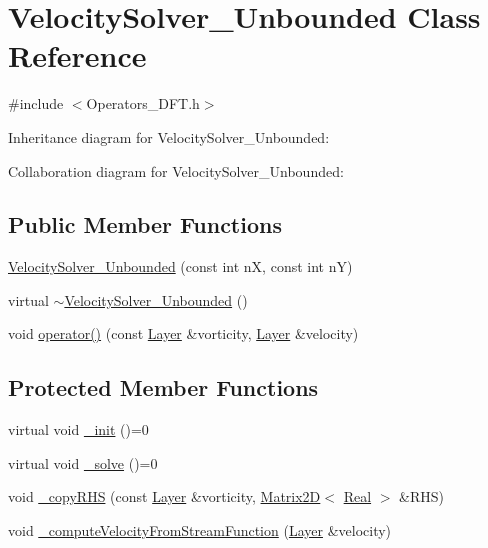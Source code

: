 \hypertarget{class_velocity_solver___unbounded}{}\section{Velocity\+Solver\+\_\+\+Unbounded Class Reference}
\label{class_velocity_solver___unbounded}


{\ttfamily \#include $<$Operators\+\_\+\+D\+F\+T.\+h$>$}



Inheritance diagram for Velocity\+Solver\+\_\+\+Unbounded\+:


Collaboration diagram for Velocity\+Solver\+\_\+\+Unbounded\+:
\subsection*{Public Member Functions}
\begin{DoxyCompactItemize}
\item 
\hyperlink{class_velocity_solver___unbounded_a2a4f55337c05bd3e5a98d732d4524031}{Velocity\+Solver\+\_\+\+Unbounded} (const int n\+X, const int n\+Y)
\item 
virtual \hyperlink{class_velocity_solver___unbounded_ad2dda95d5b3e7cb435fc7223db486f44}{$\sim$\+Velocity\+Solver\+\_\+\+Unbounded} ()
\item 
void \hyperlink{class_velocity_solver___unbounded_a55beef939974ec2b79e869a403245534}{operator()} (const \hyperlink{struct_layer}{Layer} \&vorticity, \hyperlink{struct_layer}{Layer} \&velocity)
\end{DoxyCompactItemize}
\subsection*{Protected Member Functions}
\begin{DoxyCompactItemize}
\item 
virtual void \hyperlink{class_velocity_solver___unbounded_a5e5995e7ef4cb324f6fe4085084b19e6}{\+\_\+init} ()=0
\item 
virtual void \hyperlink{class_velocity_solver___unbounded_ad4a668aa6fcd70274bb71258f2c13b2d}{\+\_\+solve} ()=0
\item 
void \hyperlink{class_velocity_solver___unbounded_a09eef51ffa637ea0ae168a72b4ed13f2}{\+\_\+copy\+R\+H\+S} (const \hyperlink{struct_layer}{Layer} \&vorticity, \hyperlink{class_matrix2_d}{Matrix2\+D}$<$ \hyperlink{_h_d_f5_dumper_8h_a445a5f0e2a34c9d97d69a3c2d1957907}{Real} $>$ \&R\+H\+S)
\item 
void \hyperlink{class_velocity_solver___unbounded_a4e8deea623b04707623a2fa82ad151b7}{\+\_\+compute\+Velocity\+From\+Stream\+Function} (\hyperlink{struct_layer}{Layer} \&velocity)
\end{DoxyCompactItemize}
